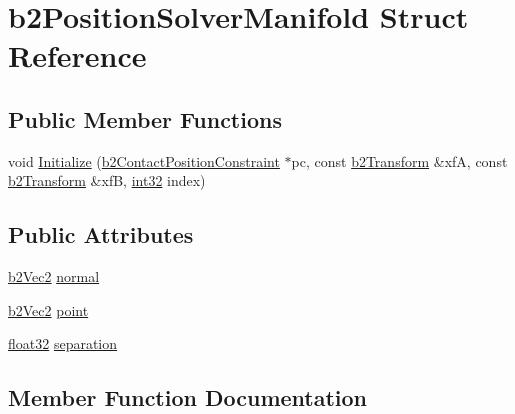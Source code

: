 \hypertarget{structb2_position_solver_manifold}{}\section{b2\+Position\+Solver\+Manifold Struct Reference}
\label{structb2_position_solver_manifold}
\subsection*{Public Member Functions}
\begin{DoxyCompactItemize}
\item 
void \mbox{\hyperlink{structb2_position_solver_manifold_affdfc2c9f455008e865b2dd6947796fa}{Initialize}} (\mbox{\hyperlink{structb2_contact_position_constraint}{b2\+Contact\+Position\+Constraint}} $\ast$pc, const \mbox{\hyperlink{structb2_transform}{b2\+Transform}} \&xfA, const \mbox{\hyperlink{structb2_transform}{b2\+Transform}} \&xfB, \mbox{\hyperlink{b2_settings_8h_a43d43196463bde49cb067f5c20ab8481}{int32}} index)
\end{DoxyCompactItemize}
\subsection*{Public Attributes}
\begin{DoxyCompactItemize}
\item 
\mbox{\hyperlink{structb2_vec2}{b2\+Vec2}} \mbox{\hyperlink{structb2_position_solver_manifold_a4a1073e69ab49f55b7013d4aef96fe1c}{normal}}
\item 
\mbox{\hyperlink{structb2_vec2}{b2\+Vec2}} \mbox{\hyperlink{structb2_position_solver_manifold_a9b7a88173cc0295e2883e2ac8b7c46f2}{point}}
\item 
\mbox{\hyperlink{b2_settings_8h_aacdc525d6f7bddb3ae95d5c311bd06a1}{float32}} \mbox{\hyperlink{structb2_position_solver_manifold_a9dd76b0c774238d3e3745d139cf6eea4}{separation}}
\end{DoxyCompactItemize}


\subsection{Member Function Documentation}
\mbox{\label{structb2_position_solver_manifold_affdfc2c9f455008e865b2dd6947796fa}} 
